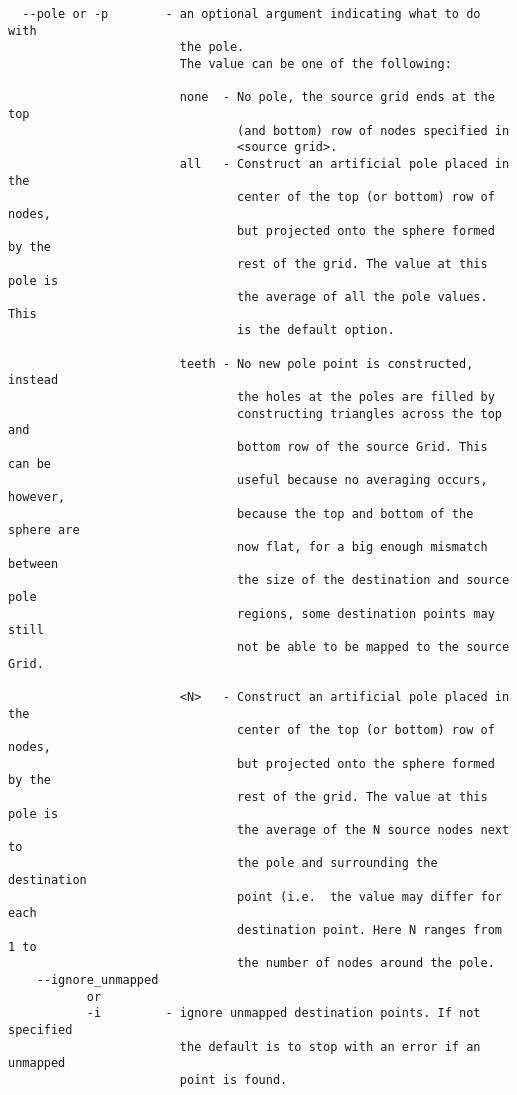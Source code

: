 \begin{verbatim}
  --pole or -p        - an optional argument indicating what to do with 
                        the pole.  
                        The value can be one of the following:

                        none  - No pole, the source grid ends at the top 
                                (and bottom) row of nodes specified in 
                                <source grid>.
                        all   - Construct an artificial pole placed in the 
                                center of the top (or bottom) row of nodes, 
                                but projected onto the sphere formed by the 
                                rest of the grid. The value at this pole is 
                                the average of all the pole values. This
                                is the default option.

                        teeth - No new pole point is constructed, instead 
                                the holes at the poles are filled by 
                                constructing triangles across the top and 
                                bottom row of the source Grid. This can be 
                                useful because no averaging occurs, however, 
                                because the top and bottom of the sphere are 
                                now flat, for a big enough mismatch between 
                                the size of the destination and source pole 
                                regions, some destination points may still 
                                not be able to be mapped to the source Grid. 

                        <N>   - Construct an artificial pole placed in the 
                                center of the top (or bottom) row of nodes, 
                                but projected onto the sphere formed by the 
                                rest of the grid. The value at this pole is 
                                the average of the N source nodes next to
                                the pole and surrounding the destination 
                                point (i.e.  the value may differ for each 
                                destination point. Here N ranges from 1 to 
                                the number of nodes around the pole. 
    --ignore_unmapped
           or 
           -i         - ignore unmapped destination points. If not specified
                        the default is to stop with an error if an unmapped
                        point is found. 


\end{verbatim}
